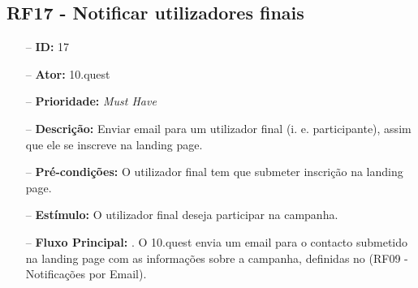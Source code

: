 \subsection{RF17 - Notificar utilizadores finais}
\begin{itemize}
	\item[--] \textbf{ID:} 17
	\item[--]  \textbf{Ator:} 10.quest
	\item[--]  \textbf{Prioridade:} \textit{Must Have}
	\item[--]  \textbf{Descrição:} Enviar email para um utilizador final (i. e. participante), assim que ele se inscreve na landing page.
	\item[--]  \textbf{Pré-condições:} O utilizador final tem que submeter inscrição na landing page.
	\item[--]  \textbf{Estímulo:} O utilizador final deseja participar na campanha.
	\item[--]  \textbf{Fluxo Principal:} 
		. O 10.quest envia um email para o contacto submetido na landing page com as informações sobre a campanha, definidas no (RF09 - Notificações por Email).
\end{itemize}
\newpage

\begin{comment}


\subsection{RF18 - Adicionar novo utilizador final}
\begin{itemize}
	\item[--] \textbf{ID:} 
	\item[--]  \textbf{Ator:} 
	\item[--]  \textbf{Prioridade:} 
	\item[--]  \textbf{Descrição:} 
	\item[--]  \textbf{Pré-condições:} 
	\item[--]  \textbf{Estimulo:}
	\item[--]  \textbf{Fluxo Principal:} 
	\subitem
	\subitem
	\subitem
	\subitem
	\item[--]  \textbf{Fluxo de Excepção:} 
	\subitem
	\subitem
	\subitem
	\subitem
	\item[--]  \textbf{Observações:} 
\end{itemize}
\newpage


\subitem 7. O 10.quest envia a informação para o TCG para que a informação seja criada a formação.
\item[--]  \textbf{Fluxo de Excepção:} 
\subitem 7a. O 10.quest não consegue enviar a informação para o TCG devido a uma falha na conexão.
\subitem 7a1. O 10.quest notifica o utilizador que ocorreu uma falha na conexão.
\subitem 7b. O serviço do TCG (API) está indisponível.
\subitem 7b1. O 10.quest notifica o utilizador que o serviço do TCG está temporariamente indisponível. 


\end{comment}


